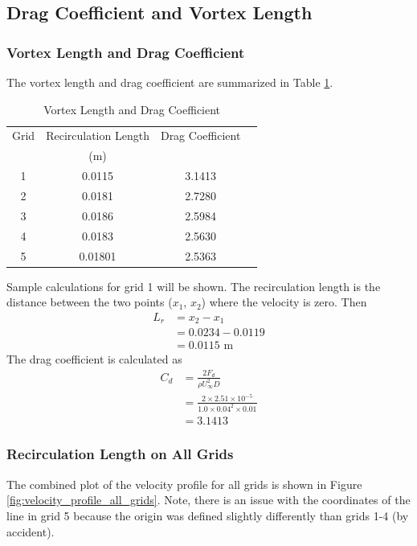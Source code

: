 \subsection{Drag Coefficient and Vortex Length}
\subsubsection{Vortex Length and Drag Coefficient}
The vortex length and drag coefficient are summarized in Table \ref{tab:vortex_length_drag_coefficient_summary}. 
\begin{table}[H]
    \centering
    \caption{Vortex Length and Drag Coefficient}
    \label{tab:vortex_length_drag_coefficient_summary}
    \begin{tabular}{cccc}
        \toprule
        Grid & Recirculation Length & Drag Coefficient \\
        & (m) & \\
        \midrule
        1 & 0.0115 & 3.1413 \\
        2 & 0.0181 & 2.7280 \\
        3 & 0.0186 & 2.5984 \\
        4 & 0.0183 & 2.5630 \\
        5 & 0.01801 & 2.5363 \\
        \bottomrule
    \end{tabular}
\end{table}
Sample calculations for grid 1 will be shown. The recirculation length is the distance between the two points ($x_1$, $x_2$) where the velocity is zero. Then
\begin{align*}
    L_r &= x_2 - x_1 \\
    &= 0.0234 - 0.0119 \\
    &= 0.0115 \text{ m}
\end{align*}
The drag coefficient is calculated as
\begin{align*}
    C_d &= \frac{2F_d}{\rho U_\infty^2 D} \\
    &= \frac{2 \times 2.51 \times 10^{-5}}{1.0 \times 0.04^2 \times 0.01} \\
    &= 3.1413
\end{align*}

\subsubsection{Recirculation Length on All Grids}
The combined plot of the velocity profile for all grids is shown in Figure \ref{fig:velocity_profile_all_grids}. Note, there is an issue with the coordinates of the line in grid 5 because the origin was defined slightly differently than grids 1-4 (by accident).

